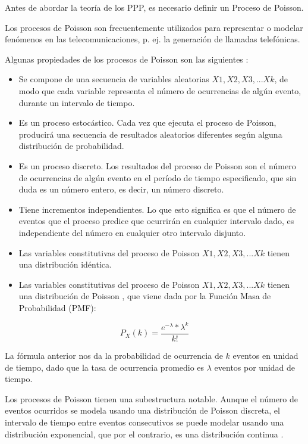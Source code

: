 Antes de abordar la teoría de los PPP, es necesario definir un Proceso de Poisson. \newline

Los procesos de Poisson son frecuentemente utilizados para representar o modelar fenómenos en las telecomunicaciones, p. ej. la generación de llamadas telefónicas.\newline

Algunas propiedades de los procesos de Poisson son las siguientes \parencite{ PoissonMedium}:

\begin{itemize}
    \item Se compone de una secuencia de variables aleatorias $X1, X2, X3, ... Xk$, de modo que cada variable representa el número de ocurrencias de algún evento, durante un intervalo de tiempo.
    \item Es un proceso estocástico. Cada vez que ejecuta el proceso de Poisson, producirá una secuencia de resultados aleatorios diferentes según alguna distribución de probabilidad.
    \item Es un proceso discreto. Los resultados del proceso de Poisson son el número de ocurrencias de algún evento en el período de tiempo especificado, que sin duda es un número entero, es decir, un número discreto.
    \item Tiene incrementos independientes. Lo que esto significa es que el número de eventos que el proceso predice que ocurrirán en cualquier intervalo dado, es independiente del número en cualquier otro intervalo disjunto.
    \item Las variables constitutivas del proceso de Poisson $X1, X2, X3, ... Xk$ tienen una distribución idéntica.
    \item Las variables constitutivas del proceso de Poisson $X1, X2, X3, ... Xk$ tienen una distribución de Poisson , que viene dada por la Función Masa de Probabilidad (PMF):
\end{itemize}

\begin{equation}
    P_{X}(k)=\frac{e^{-\lambda}*\lambda ^{k}}{k!}
    \label{eqn:Poisson}
\end{equation}

La fórmula anterior nos da la probabilidad de ocurrencia de $k$ eventos en unidad de tiempo, dado que la tasa de ocurrencia promedio es $\lambda$ eventos por unidad de tiempo.\newline

Los procesos de Poisson tienen una subestructura notable. Aunque el número de eventos ocurridos se modela usando una distribución de Poisson discreta, el intervalo de tiempo entre eventos consecutivos se puede modelar usando una distribución exponencial, que por el contrario, es una distribución continua \parencite{PoissonMedium}.\newline

